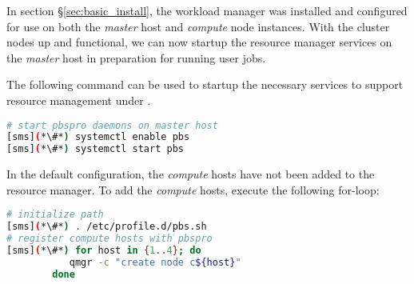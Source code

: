 In section \S\ref{sec:basic_install}, the \rms{} workload manager was installed
and configured for use on both the {\em master} host and {\em compute} node
instances. With the cluster nodes up and functional, we can now startup the
resource manager services on the {\em master} host in preparation for running 
user jobs.

The following command can be used to startup the necessary services to support
resource management under \rms{}.

\begin{lstlisting}[language=bash,keywords={}]
# start pbspro daemons on master host
[sms](*\#*) systemctl enable pbs
[sms](*\#*) systemctl start pbs
\end{lstlisting}

In the default configuration, the {\em compute} hosts have not been added to 
the \rms{} resource manager. To add the {\em compute} hosts, execute 
the following for-loop:

\begin{lstlisting}[language=bash,keywords={}]
# initialize path
[sms](*\#*) . /etc/profile.d/pbs.sh 
# register compute hosts with pbspro
[sms](*\#*) for host in {1..4}; do
           qmgr -c "create node c${host}"
        done
\end{lstlisting}
